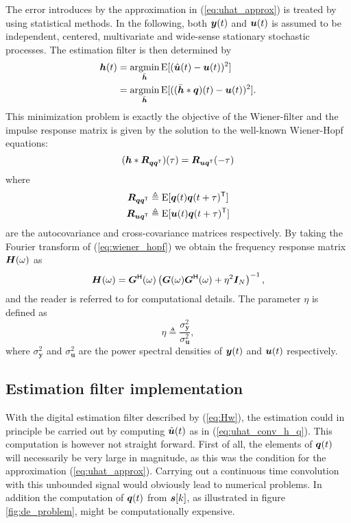 The error introduces by the approximation in (\ref{eq:uhat_approx}) is treated by using statistical methods. In the following, both $\bm{y}(t)$ and $\bm{u}(t)$ is assumed to be independent, centered, multivariate and wide-sense stationary stochastic processes. The estimation filter is then determined by
\begin{align}
    \bm{h}(t)    & = \operatorname*{argmin}_{\bar{\bm{h}}} \text{E}[(\hat{\bm{u}}(t) - \bm{u}(t))^2] \\
            & = \operatorname*{argmin}_{\bar{\bm{h}}} \text{E}[((\bar{\bm{h}}*\bm{q})(t) - \bm{u}(t))^2].
\end{align}
This minimization problem is exactly the objective of the Wiener-filter \cite{optimal_filtering} and the impulse response matrix is given by the solution to the well-known Wiener-Hopf equations:
\begin{equation}
    \label{eq:wiener_hopf}
    (\bm{h}* \bm{R}_{\bm{q}\bm{q}^\mathsf{T}})(\tau) = \bm{R}_{\bm{u}\bm{q}^\mathsf{T}}(-\tau)
\end{equation}
where
\begin{align}
    \bm{R}_{\bm{q}\bm{q}^\mathsf{T}} & \triangleq \text{E}[\bm{q}(t)\bm{q}(t+\tau)^\mathsf{T}] \\
    \bm{R}_{\bm{u}\bm{q}^\mathsf{T}} & \triangleq \text{E}[\bm{u}(t)\bm{q}(t+\tau)^\mathsf{T}]
\end{align}
are the autocovariance and cross-covariance matrices respectively. By taking the Fourier transform of (\ref{eq:wiener_hopf}) we obtain the frequency response matrix $\bm{H}(\omega)$ as
\begin{equation}
    \label{eq:Hw}
    \bm{H}(\omega) = \bm{G}^\mathsf{H}(\omega) \left( \bm{G}(\omega)\bm{G}^\mathsf{H}(\omega) + \eta^2\bm{I}_N \right)^{-1},
\end{equation}
and the reader is referred to \cite{malmberg_thesis} for computational details.
The parameter $\eta$ is defined as
\begin{equation}
    \label{eq:def_eta}
    \eta \triangleq \frac{\sigma_{\bm{y}}^2}{\sigma_{\bm{u}}^2},
\end{equation}
where $\sigma_{\bm{y}}^2$ and $\sigma_{\bm{u}}^2$ are the power spectral densities of $\bm{y}(t)$ and $\bm{u}(t)$ respectively.




\subsection{Estimation filter implementation}
With the digital estimation filter described by (\ref{eq:Hw}), the estimation could in principle be carried out by computing $\hat{\bm{u}}(t)$ as in (\ref{eq:uhat_conv_h_q}). This computation is however not straight forward. First of all, the elements of $\bm{q}(t)$ will necessarily be very large in magnitude, as this was the condition for the approximation (\ref{eq:uhat_approx}). Carrying out a continuous time convolution with this unbounded signal would obviously lead to numerical problems. In addition the computation of $\bm{q}(t)$ from $\bm{s}[k]$, as illustrated in figure \ref{fig:de_problem}, might be computationally expensive.

